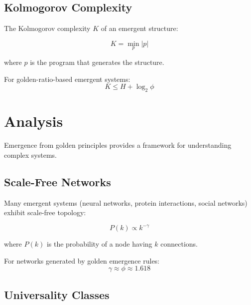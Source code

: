 \subsection{Kolmogorov Complexity}

The Kolmogorov complexity $K$ of an emergent structure:

\begin{equation}
K = \min_{p} |p|
\end{equation}

where $p$ is the program that generates the structure.

\begin{theorem}
\label{thm:emergent-bound}
For golden-ratio-based emergent systems:
\begin{equation}
K \leq H + \log_2 \phi
\end{equation}
\end{theorem}

\section{Analysis}

Emergence from golden principles provides a framework for understanding complex systems.

\subsection{Scale-Free Networks}

Many emergent systems (neural networks, protein interactions, social networks) exhibit scale-free topology:

\begin{equation}
P(k) \propto k^{-\gamma}
\end{equation}

where $P(k)$ is the probability of a node having $k$ connections.

\begin{proposition}
\label{prop:golden-network}
For networks generated by golden emergence rules:
\begin{equation}
\gamma \approx \phi \approx 1.618
\end{equation}
\end{proposition}

\subsection{Universality Classes}

